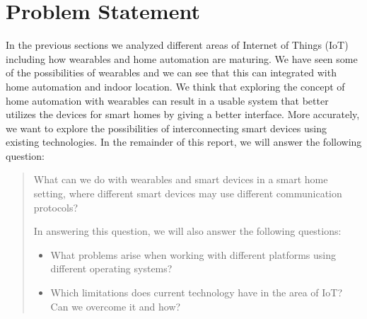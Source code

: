 \section{Problem Statement}\label{sec:researchstatement}
In the previous sections we analyzed different areas of Internet of Things (IoT) including how wearables and home automation are maturing. 
We have seen some of the possibilities of wearables and we can see that this can integrated with home automation and indoor location.
We think that exploring the concept of home automation with wearables can result in a usable system that better utilizes the devices for smart homes by giving a better interface. 
More accurately, we want to explore the possibilities of interconnecting smart devices using existing technologies.
In the remainder of this report, we will answer the following question:
\begin{framed}
    \begin{quote}
        What can we do with wearables and smart devices in a smart home setting, where different smart devices may use different communication protocols?
        
        In answering this question, we will also answer the following questions:
        \begin{itemize}
            \item What problems arise when working with different platforms using different operating systems?
            \item Which limitations does current technology have in the area of IoT? Can we overcome it and how? 
           \end{itemize} 
    \end{quote}
\end{framed}


%
